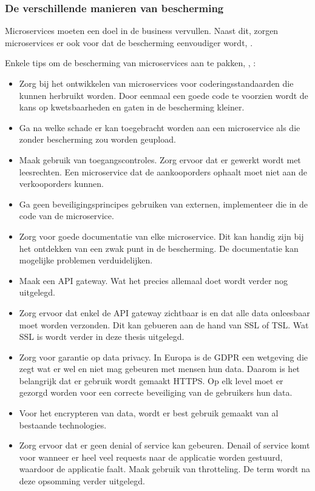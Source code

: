 \subsubsection{De verschillende manieren van bescherming}
Microservices moeten een doel in de business vervullen. Naast dit, zorgen microservices er ook voor dat de bescherming eenvoudiger wordt, \textcite{RDX2016}.

Enkele tips om de bescherming van microservices aan te pakken, \textcite{Matteson2017}, \textcite{Silva2017}:
\begin{itemize}
	\item Zorg bij het ontwikkelen van microservices voor coderingsstandaarden die kunnen herbruikt worden. Door eenmaal een goede code te voorzien wordt de kans op kwetsbaarheden en gaten in de bescherming kleiner.
	\item Ga na welke schade er kan toegebracht worden aan een microservice als die zonder bescherming zou worden geupload.
	\item Maak gebruik van toegangscontroles. Zorg ervoor dat er gewerkt wordt met leesrechten. Een microservice dat de aankooporders ophaalt moet niet aan de verkooporders kunnen.
	\item Ga geen beveiligingsprincipes gebruiken van externen, implementeer die in de code van de microservice.
	\item Zorg voor goede documentatie van elke microservice. Dit kan handig zijn bij het ontdekken van een zwak punt in de bescherming. De documentatie kan mogelijke problemen verduidelijken.
	\item Maak een API gateway. Wat het precies allemaal doet wordt verder nog uitgelegd.
	\item Zorg ervoor dat enkel de API gateway zichtbaar is en dat alle data onleesbaar moet worden verzonden. Dit kan gebueren aan de hand van SSL of TSL. Wat SSL is wordt verder in deze thesis uitgelegd. 
	\item Zorg voor garantie op data privacy. In Europa is de GDPR een wetgeving die zegt wat er wel en niet mag gebeuren met mensen hun data. Daarom is het belangrijk dat er gebruik wordt gemaakt HTTPS. Op elk level moet er gezorgd worden voor een correcte beveiliging van de gebruikers hun data. 
	\item Voor het encrypteren van data, wordt er best gebruik gemaakt van al bestaande technologies. 
	\item Zorg ervoor dat er geen denial of service kan gebeuren. Denail of service komt voor wanneer er heel veel requests naar de applicatie worden gestuurd, waardoor de applicatie faalt. Maak gebruik van throtteling. De term wordt na deze opsomming verder uitgelegd.

\end{itemize}
